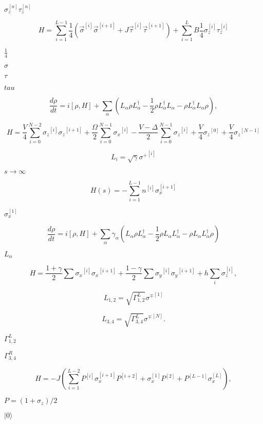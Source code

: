 \documentclass{article}
\begin{document}
{$\sigma_z^{[n]} \tau_z^{[n]}$
\pagebreak

\[
H=\sum_{i=1}^{L-1} \frac{1}{4}\left ( \vec{\sigma}^{[i]}\vec{\sigma}^{[i+1]} +
J \vec{\tau}^{[i]}\vec{\tau}^{[i+1]} \right ) +    
\sum_{i=1}^{L} B \frac{1}{4} \sigma_z^{[i]}\tau_z^{[i]} 
\]
\pagebreak

$\frac{1}{4}$
\pagebreak

$\sigma$
\pagebreak

$\tau$
\pagebreak

$tau$
\pagebreak

\[
 \frac{d\rho}{d t}=i[\rho,H]+\sum_{\alpha}\left( L_{\alpha}
 \rho L_{\alpha}^{\dagger}-\frac{1}{2} \rho L_{\alpha}^{\dagger} L_{\alpha}
 -\rho L_{\alpha}^{\dagger} L_{\alpha} \rho\right),
 \]
\pagebreak

\[
H=\frac{V}{4}\sum_{i=0}^{N-2} {\sigma_{z}}^{[i]}{\sigma_{z}}^{[i+1]}
+\frac{\Omega}{2}\sum_{i=0}^{N-1} {\sigma_{x}}^{[i]}-\frac{V-\Delta}{2}\sum_{i=0}^{N-1} {\sigma_{z}}^{[i]}
+\frac{V}{4}{\sigma_{z}}^{[0]}+\frac{V}{4}{\sigma_{z}}^{[N-1]}
\]
\pagebreak

\[
L_{i}=\sqrt{\gamma}{\sigma^{+}}^{[i]}
\]
\pagebreak

$s\to\infty$
\pagebreak

\[
H(s)=-\sum_{i=1}^{L-1} n^{[i]} \sigma_x^{[i+1]}
\]
\pagebreak

$\sigma_x^{[1]}$
\pagebreak

\[
\frac{d\rho}{d t}=i[\rho,H]+\sum_{\alpha}\gamma_{\alpha}\left( L_{\alpha}
\rho L_{\alpha}^{\dagger}-\frac{1}{2} \rho L_{\alpha} L_{\alpha}^{\dagger}
-\rho L_{\alpha} L_{\alpha}^{\dagger} \rho\right)
\]
\pagebreak

$L_{\alpha}$
\pagebreak

\[
H=\frac{1+\gamma}{2}\sum {\sigma_{x}}^{[i]}{\sigma_{x}}^{[i+1]}
+\frac{1-\gamma}{2}\sum {\sigma_{y}}^{[i]}{\sigma_{y}}^{[i+1]}
+ h\sum_i \sigma_z^{[i]},
\]
\pagebreak

\[
L_{1,2}=\sqrt{\Gamma_{1,2}^{L}}{\sigma^{\mp}}^{[1]}
\]
\pagebreak

\[
L_{3,4}=\sqrt{\Gamma_{3,4}^{L}}{\sigma^{\mp}}^{[N]}.
\]
\pagebreak

$\Gamma_{1,2}^L$
\pagebreak

$\Gamma_{3,4}^R$
\pagebreak

\[
H=-J (\sum_{i=1}^{L-2} P^{[i]} \sigma_x^{[i+1]} P^{[i+2]} + \sigma_x^{[1]} P^{[2]} + P^{[L-1]} \sigma_x^{[L]} ), 
\]
\pagebreak

$P=(1+\sigma_z)/2$
\pagebreak

$|0\rangle$
\pagebreak

}
\end{document}
